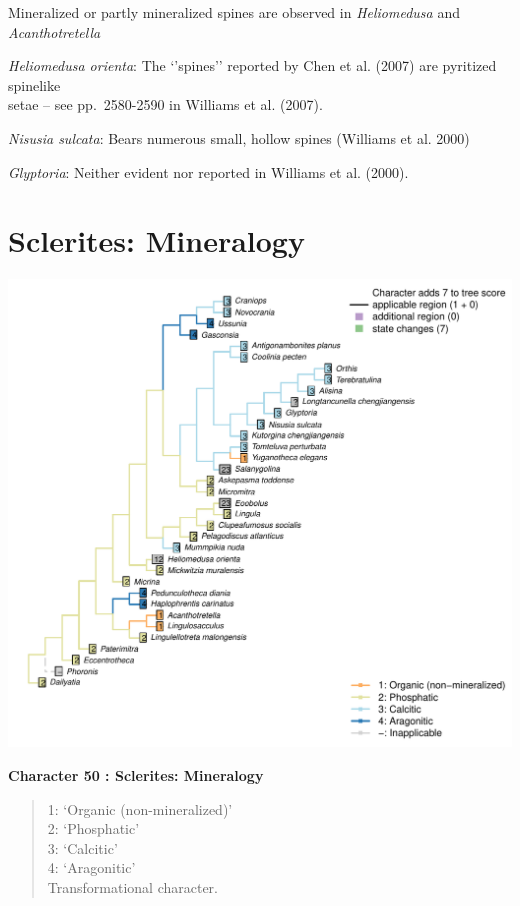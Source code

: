 \documentclass[]{book}
\theoremstyle{definition}
\theoremstyle{definition}
\theoremstyle{definition}
\theoremstyle{remark}
\begin{document}
Mineralized or partly mineralized spines are observed in
\emph{Heliomedusa} and \emph{Acanthotretella}

\emph{Heliomedusa orienta}: The `'spines'' reported by Chen et al.
(2007) are pyritized spinelike\\
setae -- see pp.~2580-2590 in Williams et al. (2007).

\emph{Nisusia sulcata}: Bears numerous small, hollow spines (Williams et
al. 2000)

\emph{Glyptoria}: Neither evident nor reported in Williams et al.
(2000).

\hypertarget{sclerites-mineralogy}{%
\section*{Sclerites: Mineralogy}\label{sclerites-mineralogy}}

\includegraphics{Brachiopod_phylogeny_files/figure-latex/unnamed-chunk-5-50.pdf}

\textbf{Character 50 : Sclerites: Mineralogy }

\begin{quote}
1: `Organic (non-mineralized)'\\
2: `Phosphatic'\\
3: `Calcitic'\\
4: `Aragonitic'\\
Transformational character.
\end{quote}
\end{document}
